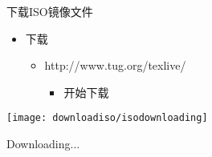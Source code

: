\documentclass[fontset = none, t]{ctexbeamer}
\begin{document}
\begin{frame}{下载\TeXLive}{ISO镜像文件}
  \begin{itemize}
  \item 下载
    \begin{itemize}
    \item
      http://www.tug.org/texlive/
      \begin{itemize}
      \item 开始下载
      \end{itemize}      
    \end{itemize}
  \end{itemize}
  \centering
  \vfill
  \texttt{[image: downloadiso/isodownloading]}
  \vfill
\end{frame}
\begin{frame}
  Downloading...
\end{frame}
\end{document}
